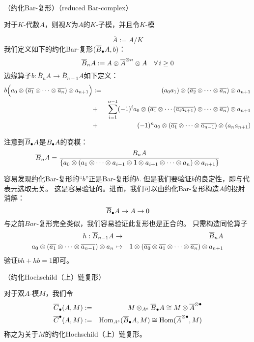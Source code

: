 \begin{definition}（约化Bar-复形）（reduced Bar-complex）

对于$K$-代数$A$，则视$K$为$A$的$K$-子模，并且令$K$-模

$$\overline{A}:=A/K$$
我们定义如下的约化Bar-复形$(\overline{B}_{\bullet} A,b)$：
$$\overline{B}_n A:=A\otimes \overline{A}^{\otimes n}\otimes A
\quad \forall \,i\geq 0$$
边缘算子$b:\overline{B}_n A\to \overline{B}_{n-1} A$如下定义：
\begin{eqnarray*}
b\Big(a_0\otimes(\overline{a_1}\otimes\cdots\otimes \overline{a_n})\otimes a_{n+1}\Big)
&:=&
 (a_0a_1)\otimes(\overline{a_2}\otimes\cdots\otimes\overline{a_n})\otimes a_{n+1}\\
&+ &
 \sum_{i=1}^{n-1}(-1)^ia_0\otimes
    (\overline{a_1}\otimes\cdots
    (\overline{a_ia_{i+1}})\otimes\cdots\otimes \overline{a_n})
    \otimes a_{n+1}\\
&+ &(-1)^n
 a_0\otimes(\overline{a_1}\otimes\cdots\otimes \overline{a_{n-1}})
   \otimes(a_na_{n+1})
\end{eqnarray*}
\end{definition}

注意到$\overline{B}_{\bullet} A$是$B_{\bullet} A$的商模：
$$\overline{B}_nA=
     \frac{B_n A}
     {\{a_0\otimes(a_1\otimes\cdots
     \otimes a_{i-1}\otimes 1\otimes a_{i+1}
     \otimes\cdots\otimes a_n)\otimes a_{n+1}\}
     }
$$

容易发现约化Bar-复形的“$b$”正是Bar-复形的$b$.
但是我们要验证$b$的良定性，即与代表元选取无关。
这是容易验证的。进而，我们可以由约化Bar-复形构造$A$的投射消解：
$$\overline{B}_{\bullet} A\to A\to 0$$
与之前$Bar$-复形完全类似，我们容易验证此复形也是正合的。
只需构造同伦算子
\begin{eqnarray*}
h:\overline{B}_{n-1}A&\to&\overline{B}_{n}A\\
a_0\otimes(\overline{a_1}\otimes\cdots\otimes \overline{a_{n-1}})\otimes a_{n}
&\mapsto&
1\otimes(\overline{a_0}\otimes\overline{a_1}\otimes\cdots\otimes \overline{a_n})\otimes a_{n+1}
\end{eqnarray*}
验证$bh+hb=1$即可。

\begin{definition}（约化Hochschild（上）链复形）

对于双$A$-模$M$，我们令
\begin{eqnarray*}
\overline{C}_{\bullet}(A,M)&:=&
M\otimes_{A^e}\overline{B}_{\bullet} A\cong M\otimes\overline{A}^{\otimes\bullet}\\
\overline{C}^{\bullet}(A,M)&:=&
\operatorname{Hom}_{A^e}(\overline{B}_{\bullet} A,M)
\cong\operatorname{Hom}(\overline{A}^{\otimes\bullet},M)
\end{eqnarray*}
称之为关于$M$的约化Hochschild（上）链复形。
\end{definition}

